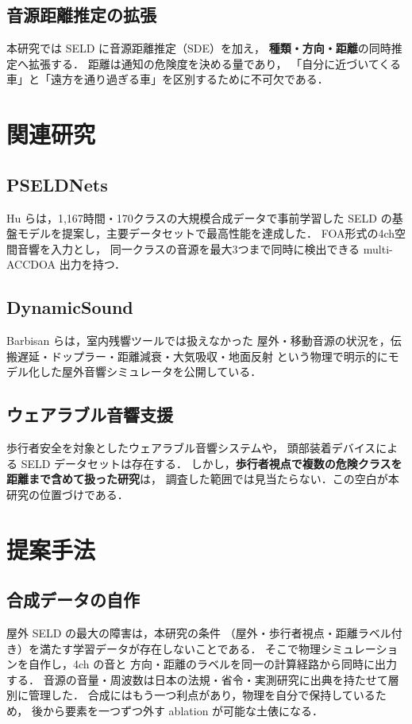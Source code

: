 \documentclass[twocolumn,a4paper,9pt]{jsarticle}
\begin{document}
\subsection{音源距離推定の拡張}
本研究では SELD に音源距離推定（SDE）を加え，
\textbf{種類・方向・距離}の同時推定へ拡張する．
距離は通知の危険度を決める量であり，
「自分に近づいてくる車」と「遠方を通り過ぎる車」を区別するために不可欠である．

\section{関連研究}

\subsection{PSELDNets}
Hu ら\cite{pseldnets}は，1,167時間・170クラスの大規模合成データで事前学習した
SELD の基盤モデルを提案し，主要データセットで最高性能を達成した．
FOA形式の4ch空間音響を入力とし，
同一クラスの音源を最大3つまで同時に検出できる
multi-ACCDOA\cite{maccdoa} 出力を持つ．

\subsection{DynamicSound}
Barbisan ら\cite{dynamicsound}は，室内残響ツールでは扱えなかった
屋外・移動音源の状況を，伝搬遅延・ドップラー・距離減衰・大気吸収・地面反射
という物理で明示的にモデル化した屋外音響シミュレータを公開している．

\subsection{ウェアラブル音響支援}
歩行者安全を対象としたウェアラブル音響システム\cite{paws}や，
頭部装着デバイスによる SELD データセット\cite{wearable}は存在する．
しかし，\textbf{歩行者視点で複数の危険クラスを距離まで含めて扱った研究}は，
調査した範囲では見当たらない．この空白が本研究の位置づけである．

\section{提案手法}

\subsection{合成データの自作}
屋外 SELD の最大の障害は，本研究の条件
（屋外・歩行者視点・距離ラベル付き）を満たす学習データが存在しないことである．
そこで物理シミュレーションを自作し，4ch の音と
方向・距離のラベルを同一の計算経路から同時に出力する．
音源の音量・周波数は日本の法規・省令・実測研究に出典を持たせて層別に管理した．
合成にはもう一つ利点があり，物理を自分で保持しているため，
後から要素を一つずつ外す ablation が可能な土俵になる．
\end{document}
